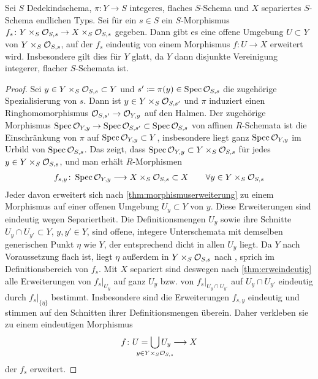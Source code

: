 \begin{Korollar}\label{thm:allgmorphismuserweiterung}
  Sei $S$ Dedekindschema,
  $\pi\colon Y\to S$ integeres, flaches $S$-Schema
  und $X$ separiertes $S$-Schema endlichen Typs.
  Sei für ein $s\in S$ ein $S$-Morphismus
  $f_s\colon Y\times_S\mathcal{O}_{S,s}\to X\times_S\mathcal{O}_{S,s}$ gegeben.
  Dann gibt es eine offene Umgebung $U\subset Y$ von
  $Y\times_S\mathcal{O}_{S,s}$, auf der $f_s$ eindeutig von einem Morphismus
  $f\colon U\to X$ erweitert wird.
  Insbesondere gilt dies für $Y$ glatt, da $Y$ dann disjunkte
  Vereinigung integerer, flacher $S$-Schemata ist.
  \begin{proof}
    Sei $y\in Y\times_S\mathcal{O}_{S,s}\subset Y$ und
    $s'\coloneqq\pi(y)\in\operatorname{Spec}\mathcal{O}_{S,s}$ die zugehörige Spezialisierung
    von $s$. Dann ist $y\in Y\times_S\mathcal{O}_{S,s'}$ und $\pi$ induziert einen
    Ringhomomorphismus $\mathcal{O}_{S,s'}\to\mathcal{O}_{Y,y}$ auf den Halmen. Der
    zugehörige Morphismus
    $\operatorname{Spec}\mathcal{O}_{Y,y}\to\operatorname{Spec}\mathcal{O}_{S,s'}\subset\operatorname{Spec}\mathcal{O}_{S,s}$
    von affinen $R$-Schemata ist die Einschränkung von $\pi$ auf
    $\operatorname{Spec}\mathcal{O}_{Y,y}\subset Y$, insbesondere  liegt ganz $\operatorname{Spec}\mathcal{O}_{Y,y}$
    im Urbild von $\operatorname{Spec}\mathcal{O}_{S,s}$.
    Das zeigt, dass $\operatorname{Spec}\mathcal{O}_{Y,y}\subset Y\times_S\mathcal{O}_{S,s}$ für jedes
    $y\in Y\times_S\mathcal{O}_{S,s}$, und man erhält $R$-Morphismen
    \begin{gather*}
      f_{s,y}\colon \operatorname{Spec}\mathcal{O}_{Y,y}\longrightarrow X\times_S\mathcal{O}_{S,s}\subset X
      \qquad \forall y \in Y\times_S\mathcal{O}_{S,s}
    \end{gather*}
    Jeder davon erweitert sich nach \ref{thm:morphismuserweiterung}
    zu einem Morphismus auf einer offenen Umgebung $U_y\subset Y$ von
    $y$.
    Diese Erweiterungen sind eindeutig wegen Separiertheit.
    Die Definitionsmengen $U_y$ sowie ihre Schnitte $U_y\cap
    U_{y'}\subset Y$, $y,y'\in Y$, sind offene, integere
    Unterschemata mit demselben generischen Punkt $\eta$ wie $Y$, der
    entsprechend dicht in allen $U_y$ liegt.
    Da $Y$ nach Voraussetzung flach ist, liegt $\eta$ außerdem in
    $Y\times_S\mathcal{O}_{S,s}$ nach \cite[Proposition 14.14]{wedhorn}, sprich
    im Definitionsbereich von $f_s$. Mit $X$ separiert sind deswegen nach
    \ref{thm:erweindeutig} alle Erweiterungen von $f_s|_{U_y}$ auf
    ganz $U_y$ bzw. von $f_s|_{U_y\cap U_{y'}}$ auf $U_y\cap U_{y'}$
    eindeutig durch $f_s|_{\{\eta\}}$ bestimmt.
    Insbesondere sind die Erweiterungen $f_{s,y}$ eindeutig und
    stimmen auf den Schnitten ihrer Definitionsmengen überein.
    Daher verkleben sie zu einem eindeutigen Morphismus
    \begin{gather*}
      f\colon U=\bigcup_{\mathclap{y\in Y\times_S\O_{S,s}}} U_y\longto X
    \end{gather*}
    der $f_s$ erweitert.
  \end{proof}
\end{Korollar}
